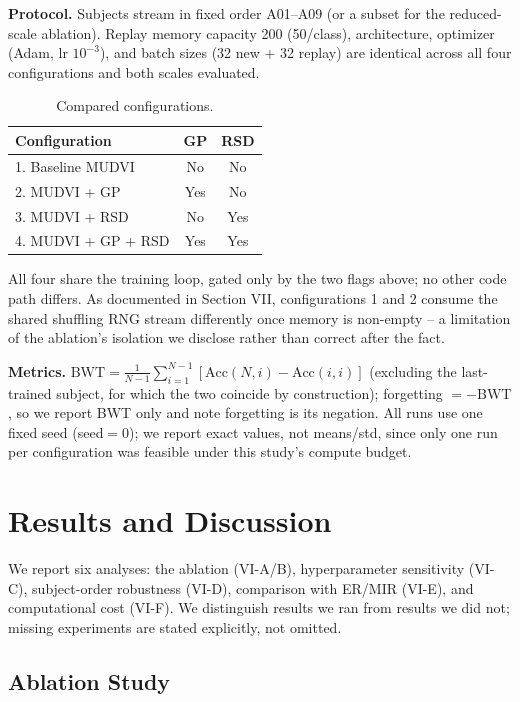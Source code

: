 \documentclass[conference]{IEEEtran}
\begin{document}
\textbf{Protocol.} Subjects stream in fixed order A01--A09 (or a subset for the reduced-scale ablation). Replay memory capacity 200 (50/class), architecture, optimizer (Adam, lr $10^{-3}$), and batch sizes (32 new + 32 replay) are identical across all four configurations and both scales evaluated.

\begin{table}[t]
\caption{Compared configurations.}
\label{tab:configs}
\centering
\begin{tabular}{@{}lcc@{}}
\toprule
Configuration & GP & RSD \\
\midrule
1. Baseline MUDVI & No & No \\
2. MUDVI + GP & Yes & No \\
3. MUDVI + RSD & No & Yes \\
4. MUDVI + GP + RSD & Yes & Yes \\
\bottomrule
\end{tabular}
\end{table}

All four share the training loop, gated only by the two flags above; no other code path differs. As documented in Section VII, configurations 1 and 2 consume the shared shuffling RNG stream differently once memory is non-empty -- a limitation of the ablation's isolation we disclose rather than correct after the fact.

\textbf{Metrics.} $\mathrm{BWT}=\frac{1}{N-1}\sum_{i=1}^{N-1}[\mathrm{Acc}(N,i)-\mathrm{Acc}(i,i)]$ (excluding the last-trained subject, for which the two coincide by construction); forgetting $=-\mathrm{BWT}$, so we report BWT only and note forgetting is its negation. All runs use one fixed seed (seed$=0$); we report exact values, not means/std, since only one run per configuration was feasible under this study's compute budget.

\section{Results and Discussion}

We report six analyses: the ablation (VI-A/B), hyperparameter sensitivity (VI-C), subject-order robustness (VI-D), comparison with ER/MIR (VI-E), and computational cost (VI-F). We distinguish results we ran from results we did not; missing experiments are stated explicitly, not omitted.

\subsection{Ablation Study}
\label{sec:ablation}
\end{document}
